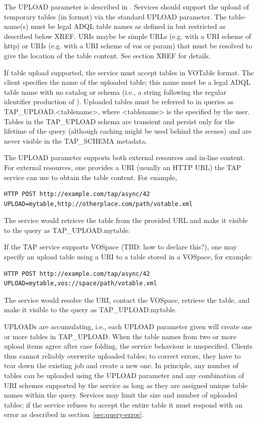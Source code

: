 \documentclass[11pt,letter]{ivoa}
\begin{document}
The UPLOAD parameter is described in \citep{std:DALI}. Services should support 
the 
upload of temporary tables (in \citep{std:VOTable} format) via the standard 
UPLOAD 
parameter. The table-name(s) must be legal ADQL table names as defined in 
\citep{std:ADQL} but restricted as described below XREF. URIs maybe be simple 
URLs 
(e.g. with a URI scheme of http) or URIs (e.g. with a URI scheme of vos or 
param) that must be resolved to give the location of the table content. See 
section XREF for details.

If table upload supported, the service must accept tables in VOTable format. 
The client specifies the name of the uploaded table; this name must be a legal 
ADQL table name with no catalog or schema (i.e., a string following the 
regular identifier production of \citep{std:ADQL}). Uploaded tables must be 
referred 
to in queries as TAP\_UPLOAD.<tablename>, where <tablename> is the 
specified by the user. Tables in the TAP\_UPLOAD schema are 
transient and persist only for the lifetime of the query (although caching might 
be used behind the scenes) and are never visible in the 
TAP\_SCHEMA metadata.

The \citep{std:DALI} UPLOAD parameter supports both external resources and 
in-line 
content. For external resources, one provides a URI (usually an HTTP URL) the 
TAP service can use to obtain the table content. For example,
\begin{verbatim}
HTTP POST http://example.com/tap/async/42
UPLOAD=mytable,http://otherplace.com/path/votable.xml
\end{verbatim}
The service would retrieve the table from the provided URL and 
make it visible to the query as TAP\_UPLOAD.mytable.

If the TAP service supports VOSpace (TBD: how to declare this?), one may 
specify an upload table using a URI to a table stored in a VOSpace, for example:
\begin{verbatim}
HTTP POST http://example.com/tap/async/42
UPLOAD=mytable,vos://space/path/votable.xml
\end{verbatim}
The service would resolve the URI, contact the VOSpace, retrieve the table, and 
make it visible to the query as TAP\_UPLOAD.mytable.

UPLOADs are accumulating, i.e., each UPLOAD parameter given will create one or 
more tables in TAP\_UPLOAD. When the table names from two or more 
upload items agree after case folding, the service behaviour is unspecified. 
Clients thus cannot reliably overwrite uploaded tables; to correct errors, they 
have to tear down the existing job and create a new one. In principle, any 
number of tables can be uploaded using the UPLOAD parameter and any combination 
of URI schemes supported by the service as long as they are assigned unique 
table names within the query. Services may limit the size and number of 
uploaded tables; if the service refuses to accept the entire table it must 
respond with an error as described in section~\ref{sec:query-error}.
\end{document}
